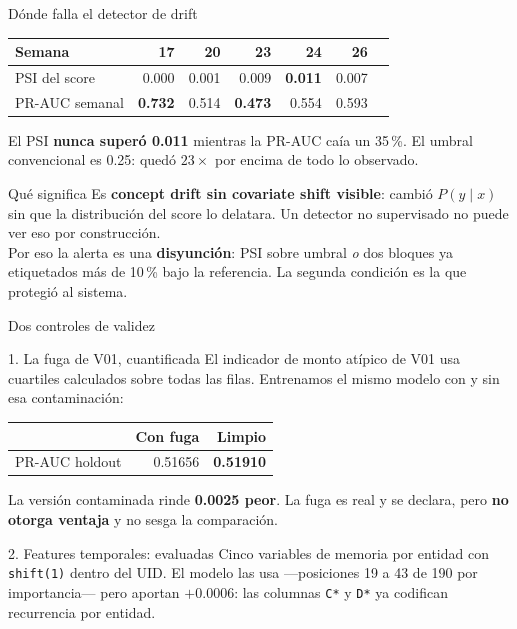 \documentclass[aspectratio=169,10pt]{beamer}
\begin{document}
\begin{frame}{Dónde falla el detector de drift}\small
\begin{center}
\begin{tabular}{@{}lrrrrrr@{}}\toprule
Semana & 17 & 20 & 23 & 24 & 26\\\midrule
PSI del score & 0.000 & 0.001 & 0.009 & \textbf{0.011} & 0.007\\
PR-AUC semanal & \textbf{0.732} & 0.514 & \textbf{0.473} & 0.554 & 0.593\\\bottomrule
\end{tabular}
\end{center}
\vspace{2mm}
El PSI \textbf{nunca superó 0.011} mientras la PR-AUC caía un 35\,\%. El umbral convencional es 0.25: quedó $23\times$ por encima de todo lo observado.
\vfill
\begin{block}{Qué significa}
Es \textbf{concept drift sin covariate shift visible}: cambió $P(y\mid x)$ sin que la distribución del score lo delatara. Un detector no supervisado no puede ver eso por construcción.\\[2mm]
Por eso la alerta es una \textbf{disyunción}: PSI sobre umbral \emph{o} dos bloques ya etiquetados más de 10\,\% bajo la referencia. La segunda condición es la que protegió al sistema.
\end{block}
\end{frame}

\begin{frame}{Dos controles de validez}\small
\begin{block}{1. La fuga de V01, cuantificada}
El indicador de monto atípico de V01 usa cuartiles calculados sobre todas las filas. Entrenamos el mismo modelo con y sin esa contaminación:\\[2mm]
\begin{center}
\begin{tabular}{@{}lrr@{}}\toprule
 & Con fuga & Limpio\\\midrule
PR-AUC holdout & 0.51656 & \textbf{0.51910}\\\bottomrule
\end{tabular}
\end{center}
\vspace{1mm}
La versión contaminada rinde \textbf{0.0025 peor}. La fuga es real y se declara, pero \textbf{no otorga ventaja} y no sesga la comparación.
\end{block}
\begin{block}{2. Features temporales: evaluadas}
Cinco variables de memoria por entidad con \texttt{shift(1)} dentro del UID. El modelo las usa —posiciones 19 a 43 de 190 por importancia— pero aportan $+0.0006$: las columnas \texttt{C*} y \texttt{D*} ya codifican recurrencia por entidad.
\end{block}
\end{frame}
\end{document}
